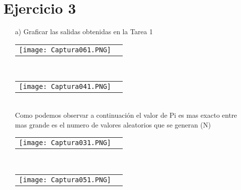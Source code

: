 \documentclass[10pt]{article}\usepackage[]{graphicx}\usepackage[]{color}
\begin{document}
\section{Ejercicio 3}
\begin{itemize}
\item[a)]Graficar las salidas obtenidas en la Tarea 1\\
\begin{tabular}{p{} p{} }
\texttt{[image: Captura061.PNG]}
\end{tabular}\\
\begin{tabular}{p{} p{} }
\texttt{[image: Captura041.PNG]}
\end{tabular}\\
Como podemos observar a continuación el valor de Pi es mas exacto entre mas grande es el numero de valores aleatorios que se generan (N)\\
\begin{tabular}{p{} p{} }
\texttt{[image: Captura031.PNG]}
\end{tabular}\\
\begin{tabular}{p{} p{} }
\texttt{[image: Captura051.PNG]}
\end{tabular}\\
\end{itemize}
\end{document}
